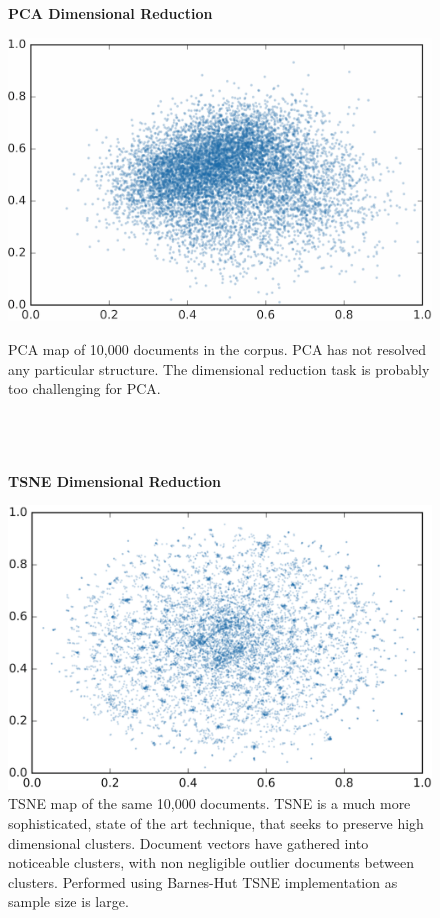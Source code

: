 \begin{figure}[H]
  \centering
  \begin{minipage}[b]{0.49\textwidth}
	\begin{center}\textbf{PCA Dimensional Reduction}\end{center}
    \includegraphics[width=\textwidth]{Validation/pca2.png}
    \caption[PCA Dimensional Reduction]{PCA map of 10,000 documents in the corpus. PCA has not resolved any particular structure. The dimensional reduction task is probably too challenging for PCA.\\ \\ \\ \\}
      \label{fig:PCA_snap}
  \end{minipage}
  \hfill
  \begin{minipage}[b]{0.49\textwidth}
  \begin{center}\textbf{TSNE Dimensional Reduction}\end{center}
    \includegraphics[width=\textwidth]{Validation/tsne2.png}
    \caption[TSNE Dimensional Reduction]{TSNE map of the same 10,000 documents. TSNE is a much more sophisticated, state of the art technique, that seeks to preserve high dimensional clusters. Document vectors have gathered into noticeable clusters, with non negligible outlier documents between clusters. Performed using Barnes-Hut TSNE implementation as sample size is large. }
      \label{fig:TSNE_snap}

  \end{minipage}
\end{figure}
